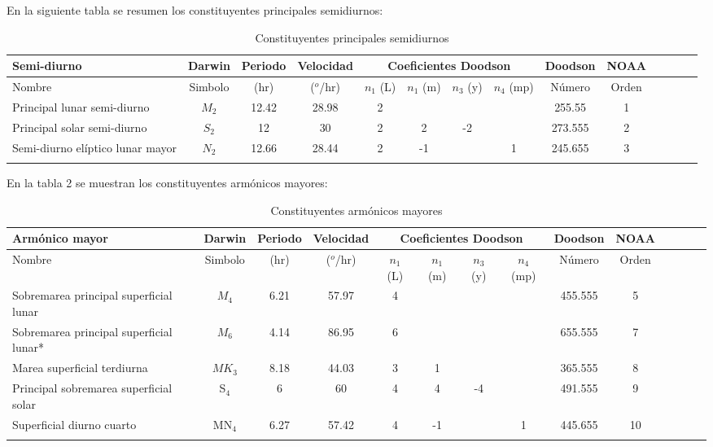 \documentclass[12pt,letterpaper]{article}
\begin{document}
En la siguiente tabla se resumen los constituyentes principales semidiurnos\cite{a}:
\begin{center}
	\begin{longtable}{|p{2.7cm}|c|c|c|c|c|c|c|c|c|c|c|c|c}
  	\hline
Semi-diurno & Darwin & Periodo & Velocidad & \multicolumn{4}{c}{Coeficientes Doodson} & Doodson &  NOAA \\
\hline
Nombre & Simbolo & (hr) & ($^o$/hr) & $n_{1}$ (L) & $n_{1}$ (m) &	$n_{3}$ (y) &	$n_{4}$ (mp) & Número  & Orden\\
\hline
Principal lunar semi-diurno & $M_{2}$ & 	12.42 	& 28.98 &	2 & & & & 255.55 & 1\\
Principal solar semi-diurno & $S_{2}$ & 12 &	30 &	2 &	2 &	-2 & & 273.555 & 2 \\
Semi-diurno elíptico lunar mayor &
 	$N_{2}$ &	12.66 &	28.44 &	2 &	-1 & &		1 &	245.655 & 3 \\
    \hline
\caption{Constituyentes principales semidiurnos}  
\end{longtable}
\end{center}

	
En la tabla 2 se muestran los constituyentes armónicos mayores\cite{a}:
\begin{center}
	\begin{longtable}{|p{2.7cm}|c|c|c|c|c|c|c|c|c|c|c|c|c}
  	\hline
Armónico mayor & Darwin & Periodo & Velocidad & \multicolumn{4}{c}{Coeficientes Doodson} & Doodson &  NOAA \\
\hline
Nombre & Simbolo & (hr) & ($^o$/hr) & $n_{1}$ (L) & $n_{1}$ (m) &	$n_{3}$ (y) &	$n_{4}$ (mp) & Número  & Orden\\
\hline
Sobremarea principal superficial lunar
& $M_{4}$ &	6.21 & 	57.97 &	4 & & & &  455.555 & 5\\
Sobremarea principal superficial lunar* & 	$M_{6}$ 	& 4.14& 	86.95 & 	6 & & & & 655.555 & 7 \\
Marea superficial terdiurna &
$MK_{3}$ & 	8.18 &	44.03 &	3 &	1 & & & 365.555 & 8 \\
Principal sobremarea superficial solar & S$_{4}$ &	6 &	60 &	4 &	4 &	-4 & & 491.555 & 9 \\
Superficial diurno cuarto &	MN$_4$ &	6.27 &	57.42 &	4 &	-1 & & 1 &	445.655 & 10\\

    \hline
\caption{Constituyentes armónicos mayores}  
\end{longtable}
\end{center}
\end{document}
